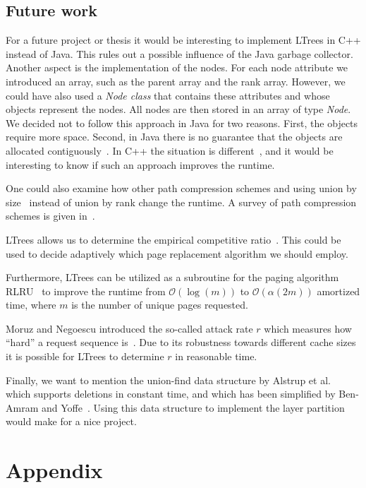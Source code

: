\documentclass[a4paper,12pt, titlepage]{article}  %
\newcommand{\oh}{\mathcal{O}}   %
\begin{document}
\subsection{Future work}
For a future project or thesis it would be interesting to implement LTrees 
in C++ instead of Java. This rules out a possible influence of the Java garbage collector. 
Another aspect is the implementation of the nodes. For each node attribute we introduced 
an array, such as the parent array and the rank array. However, we could have also used
a \emph{Node class} that contains these attributes and whose objects represent the nodes. 
All nodes are then stored in an array 
of type \emph{Node}. We decided not to follow this approach in Java for two reasons. 
First, the objects require more space. Second, in Java there is no guarantee that the objects
are allocated contiguously~\cite{objectsContiguous_java}. In C++ the situation is different~\cite{objectsContiguous_cpp}, 
and it would be interesting to know if such an approach improves the runtime.

One could also examine how other path compression schemes and using union by size~\cite{galler64} 
instead of union by rank change the runtime. A survey of path compression schemes is 
given in~\cite{tarjan_leeuwen84, patwary10}. 

LTrees allows us to determine the empirical competitive ratio~\cite{moruz_soda12}. 
This could be used to decide adaptively which page replacement algorithm we should employ. 

Furthermore, LTrees can be utilized as a subroutine for the paging algorithm RLRU~\cite{boyar07} 
to improve the runtime from $\oh(\log(m))$ to $\oh(\alpha(2m))$ amortized time, where $m$ is 
the number of unique pages requested.

Moruz and Negoescu introduced the so-called attack rate $r$ which measures how ``hard'' a request sequence is~\cite{moruz_soda12}.
Due to its robustness towards different cache sizes it is possible for LTrees to determine $r$ in reasonable time. 

Finally, we want to mention the union-find data structure by Alstrup et al.~\cite{alstrup05} which supports
deletions in constant time, and which has been simplified by Ben-Amram and Yoffe~\cite{ben-amram11, ben-amram11_corrigendum}.
Using this data structure to implement the layer partition would make for a nice project.


\clearpage
\section*{Appendix}
\appendix
{}
\end{document}
